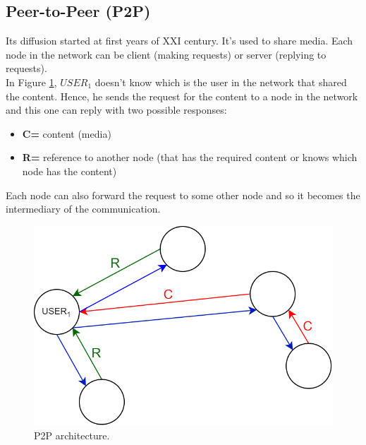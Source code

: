 \subsection{Peer-to-Peer (P2P)}
Its diffusion started at first years of XXI century. It's used to share media. Each node in the network can be client (making requests) or server (replying to requests).\\
In Figure \ref{p2p}, $USER_1$ doesn't know which is the user in the network that shared the content. Hence, he sends the request for the content to a node in the network and this one can reply with two possible responses:
\begin{itemize}
\item{\textbf{C=} content (media)}
\item{\textbf{R=} reference to another node (that has the required content or knows which node has the content)}
\end{itemize}
Each node can also forward the request to some other node and so it becomes the intermediary of the communication.
\begin{figure}[h]
\centering
\includegraphics[scale=0.4]{Images/OSI/p2p}
\caption{\footnotesize{P2P architecture.\\}}\label{p2p}
\end{figure}

